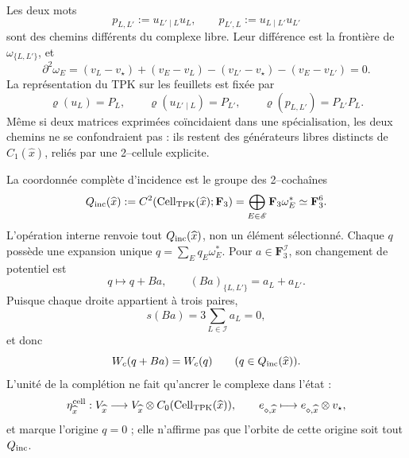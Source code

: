 Les deux mots
\[
 p_{L,L'}:=u_{L'\mid L}u_L,\qquad
 p_{L',L}:=u_{L\mid L'}u_{L'}
\]
sont des chemins différents du complexe libre. Leur différence est la frontière de \(\omega_{\{L,L'\}}\), et
\begin{equation}
\label{eq:pdfv2-cor-cell-dos-cero}
 \partial^2\omega_E
 =(v_L-v_\star)+(v_E-v_L)
 -(v_{L'}-v_\star)-(v_E-v_{L'})=0.
\end{equation}
La représentation du TPK sur les feuillets est fixée par
\[
 \varrho(u_L)=P_L,\qquad
 \varrho(u_{L'\mid L})=P_{L'},\qquad
 \varrho(p_{L,L'})=P_{L'}P_L.
\]
Même si deux matrices exprimées coïncidaient dans une spécialisation, les deux chemins ne se confondraient pas : ils restent des générateurs libres distincts de \(C_1(\widehat x)\), reliés par une 2--cellule explicite.

La coordonnée complète d'incidence est le groupe des 2--cochaînes
\begin{equation}
\label{eq:pdfv2-cor-q-incidencia-total}
 Q_{\rm inc}(\widehat x):=
 C^2(\operatorname{Cell}_{\rm TPK}(\widehat x);\mathbf F_3)
 =\bigoplus_{E\in\mathscr E}\mathbf F_3\omega_E^*
 \simeq\mathbf F_3^6.
\end{equation}
L'opération interne renvoie tout \(Q_{\rm inc}(\widehat x)\), non un élément sélectionné. Chaque \(q\) possède une expansion unique \(q=\sum_Eq_E\omega_E^*\). Pour \(a\in\mathbf F_3^{\mathscr I}\), son changement de potentiel est
\begin{equation}
\label{eq:pdfv2-cor-collar-variacion}
 q\longmapsto q+Ba,\qquad (Ba)_{\{L,L'\}}=a_L+a_{L'}.
\end{equation}
Puisque chaque droite appartient à trois paires,
\[
 s(Ba)=3\sum_{L\in\mathscr I}a_L=0,
\]
et donc
\begin{equation}
\label{eq:pdfv2-cor-wc-invariante-celular}
 W_c(q+Ba)=W_c(q)\qquad(q\in Q_{\rm inc}(\widehat x)).
\end{equation}
L'unité de la complétion ne fait qu'ancrer le complexe dans l'état :
\begin{equation}
\label{eq:pdfv2-cor-cell-unidad}
 \eta^{\rm cell}_{\widehat x}:V_{\widehat x}\longrightarrow
 V_{\widehat x}\otimes C_0(\operatorname{Cell}_{\rm TPK}(\widehat x)),\qquad
 e_{\diamond,\widehat x}\longmapsto
 e_{\diamond,\widehat x}\otimes v_\star,
\end{equation}
et marque l'origine \(q=0\) ; elle n'affirme pas que l'orbite de cette origine soit tout \(Q_{\rm inc}\).

